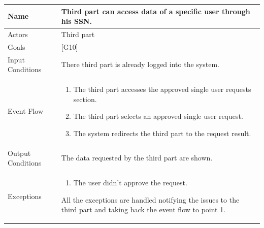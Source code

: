 \documentclass{article}
\begin{document}
\begin{center}
    \begin{tabular}{ | l | p{10cm} |}
    \hline
    Name & Third part can access data of a specific user through his SSN.\\ \hline
    Actors & Third part\\ \hline
   	Goals & {[G10]}\\ \hline
    Input Conditions & There third part is already logged into the system.\\ \hline
    Event Flow & \begin{enumerate}
    	\item The third part accesses the approved single user requests section.
    	\item The third part selects an approved single user request. 
    	\item The system redirects the third part to the request result.
    \end{enumerate} \\ \hline
    Output Conditions & The data requested by the third part are shown.  \\ \hline
    Exceptions & \begin{enumerate}
   \item The user didn't approve the request.
\end{enumerate} All the exceptions are handled notifying the issues to the third part and taking back the event flow to point 1.    \\ \hline
    \end{tabular}
\end{center}
\end{document}
